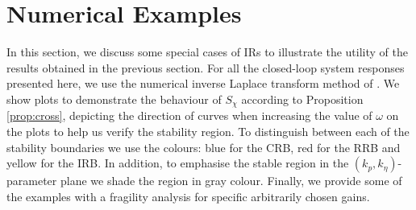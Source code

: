 \documentclass[twoside,reqno,11pt]{fcaa-var} %
\begin{document}
\section{Numerical Examples}\label{sec:Numerics}
In this section, we discuss some special cases of IRs to illustrate the utility of the results obtained in the previous section. For all the closed-loop system responses presented here, we use the numerical inverse Laplace transform method of \cite{Abate2006}. We show plots to demonstrate the behaviour of $S_\chi$ according to Proposition \ref{prop:cross}, depicting the direction of curves when increasing the value of $\omega$ on the plots to help us verify the stability region. To distinguish between each of the stability boundaries we use the colours: blue for the CRB, red for the RRB and yellow for the IRB. In addition, to emphasise the stable region in the $(k_p,k_\eta)$-parameter plane we shade the region in gray colour. Finally, we provide some of the examples with a fragility analysis for specific arbitrarily chosen gains. 
\end{document}
